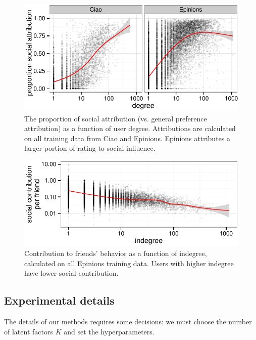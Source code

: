 \documentclass{sig-alternate-2013}
\begin{document}
\begin{figure}[ht]
\hspace{-10px}
\includegraphics[width=\columnwidth]{../fig/preferences_by_degree.pdf}
\caption{The proportion of social attribution (vs. general preference attribution) as a function of user degree.
Attributions are calculated on all training data from Ciao and Epinions.  Epinions
attributes a larger portion of rating to social influence.}\label{fig:preferences}
\end{figure}

\begin{figure}[ht]
\hspace{-10px}
\includegraphics[width=\columnwidth]{../fig/influence_by_degree.pdf}
\caption{Contribution to friends' behavior as a function of indegree,
calculated on all Epinions training data.
Users with higher indegree have lower social contribution.
}\label{fig:influence}
\end{figure}


\subsection{Experimental details}

The details of our methods requires some decisions: we must choose the
number of latent factors $K$ and set the hyperparameters.
\end{document}
